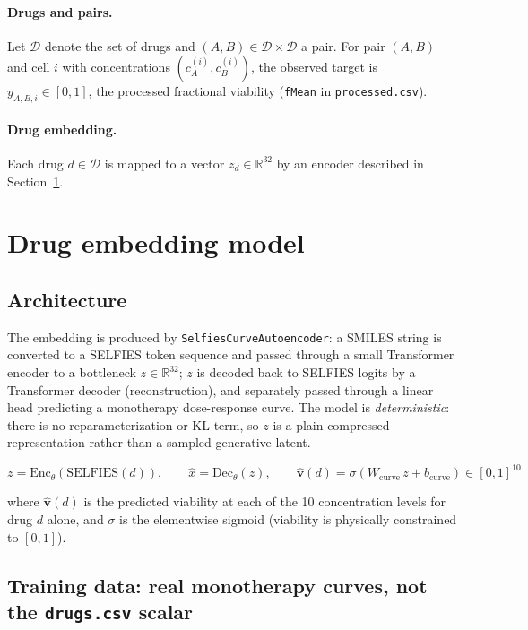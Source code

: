 \documentclass[11pt]{article}
\begin{document}
\paragraph{Drugs and pairs.} Let $\mathcal{D}$ denote the set of drugs and $(A, B) \in \mathcal{D}\times\mathcal{D}$ a pair. For pair $(A,B)$ and cell $i$ with concentrations $(c_A^{(i)}, c_B^{(i)})$, the observed target is $y_{A,B,i} \in [0,1]$, the processed fractional viability (\texttt{fMean} in \texttt{processed.csv}).

\paragraph{Drug embedding.} Each drug $d \in \mathcal{D}$ is mapped to a vector $z_d \in \mathbb{R}^{32}$ by an encoder described in Section~\ref{sec:embedding}.

\section{Drug embedding model}
\label{sec:embedding}

\subsection{Architecture}

The embedding is produced by \texttt{SelfiesCurveAutoencoder}: a SMILES string is converted to a SELFIES token sequence and passed through a small Transformer encoder to a bottleneck $z \in \mathbb{R}^{32}$; $z$ is decoded back to SELFIES logits by a Transformer decoder (reconstruction), and separately passed through a linear head predicting a monotherapy dose-response curve. The model is \emph{deterministic}: there is no reparameterization or KL term, so $z$ is a plain compressed representation rather than a sampled generative latent.

\[
z = \mathrm{Enc}_\theta(\mathrm{SELFIES}(d)), \qquad
\hat{x} = \mathrm{Dec}_\theta(z), \qquad
\hat{\mathbf{v}}(d) = \sigma\!\left(W_{\mathrm{curve}}\, z + b_{\mathrm{curve}}\right) \in [0,1]^{10}
\]

where $\hat{\mathbf{v}}(d)$ is the predicted viability at each of the 10 concentration levels for drug $d$ alone, and $\sigma$ is the elementwise sigmoid (viability is physically constrained to $[0,1]$).

\subsection{Training data: real monotherapy curves, not the \texttt{drugs.csv} scalar}
\label{sec:label-fix}
\end{document}
